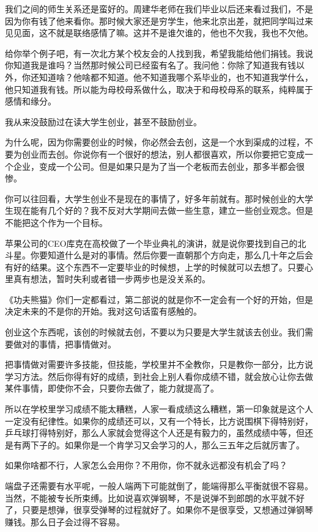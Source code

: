 我们之间的师生关系还是蛮好的。周建华老师在我们毕业以后还来看过我们，不是因为你有钱了他来看你。那时候大家还是穷学生，他来北京出差，就把同学叫过来见见面，这不就是联络感情了嘛。这并不是谁欠谁的，他也不欠我，我也不欠他。

给你举个例子吧，有一次北方某个校友会的人找到我，希望我能给他们捐钱。我说你知道我是谁吗？当然那时候公司已经蛮有名了。我问他：你除了知道我有钱以外，你还知道啥？他啥都不知道。他不知道我哪个系毕业的，也不知道我学什么，他只知道我有钱。所以能为母校母系做什么，取决于和母校母系的联系，纯粹属于感情和缘分。


我从来没鼓励过在读大学生创业，甚至不鼓励创业。

为什么呢，因为你需要创业的时候，你必然会去创，这是一个水到渠成的过程，不要为创业而去创。你说你有一个很好的想法，别人都很喜欢，所以你要把它变成一个企业，变成一个公司。但是如果只是为了当一个老板而去创业，那多半都会很惨。

你可以往回看，大学生创业不是现在的事情了，好多年前就有。那时候创业的大学生现在能有几个好的？我不反对大学期间去做一些生意，建立一些创业观念。但是不能把这个作为一个目标。

苹果公司的CEO库克在高校做了一个毕业典礼的演讲，就是说你要找到自己的北斗星。你要知道什么是对的事情。然后你要一直朝那个方向走，那么几十年之后会有好的结果。这个东西不一定要毕业的时候想，上学的时候就可以去想了。只要心里真有想法，暂时失利或者错一步两步也是没关系的。

《功夫熊猫》你们一定都看过，第二部说的就是你不一定会有一个好的开始，但是决定未来的不是你的开始。我对这句话蛮有感触的。

创业这个东西呢，该创的时候就去创，不要以为只要是大学生就该去创业。我们需要做对的事情，把事情做对。

把事情做对需要许多技能，但技能，学校里并不全教你，只是教你一部分，比方说学习方法。然后你得有好的成绩，到社会上别人看你成绩不错，就会放心让你去做某件事情，即使你不会，只要你去做了，能力就提高了。

所以在学校里学习成绩不能太糟糕，人家一看成绩这么糟糕，第一印象就是这个人一定没有纪律性。如果你的成绩还可以，又有一个特长，比方说围棋下得特别好，乒乓球打得特别好，那么人家就会觉得这个人还是有毅力的，虽然成绩中等，但还是有两下子的。如果你是一个肯学习又会学习的人，那么三五年之后就厉害了。

如果你啥都不行，人家怎么会用你？不用你，你不就永远都没有机会了吗？

端盘子还需要有水平呢，一般人端两下可能就倒了，能端得那么平衡就很不容易。当然，不能被专长所束缚。比如说喜欢弹钢琴，不是说弹不到郎朗的水平就不好了，只要是想弹，很享受弹琴的过程就好了。如果你不是很享受，又想通过弹钢琴赚钱。那么日子会过得不容易。

